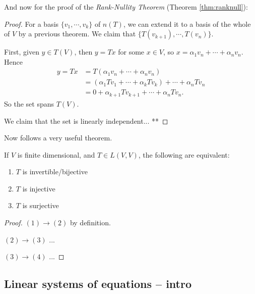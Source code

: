 And now for the proof of the \emph{Rank-Nullity Theorem} (Theorem \ref{thm:ranknull}):
\begin{proof}
  For a basis $\{v_1,\cdots,v_k\}$ of $n(T)$, we can extend it to a basis of the whole of $V$ by a previous theorem. We claim that $\{T(v_{k+1}), \cdots, T(v_{n})\}$.

  First, given $y\in T(V)$, then $y=Tx$ for some $x\in V$, so $x=\alpha_1 v_n + \cdots + \alpha_n v_n$. Hence
  \begin{align*}
    y = Tx &= T(\alpha_1 v_n + \cdots + \alpha_n v_n)\\
      &= (\alpha_1 Tv_1 + \cdots + \alpha_k Tv_k) + \cdots + \alpha_n Tv_n\\
      &= 0 + \alpha_{k+1} Tv_{k+1} + \cdots + \alpha_n Tv_n.
  \end{align*}
  So the set spans $T(V)$.

  We claim that the set is linearly independent... **
\end{proof}


Now follows a very useful theorem.
\begin{theorem}
  If $V$ is finite dimensional, and $T\in L(V,V)$, the following are equivalent:
  \begin{enumerate}[(1)]
    \item $T$ is invertible/bijective
    \item $T$ is injective
    \item $T$ is surjective
  \end{enumerate}
\end{theorem}
\begin{proof}
  $(1)\to(2)$ by definition.

  $(2)\to(3)$ ...

  $(3)\to(4)$ ...
\end{proof}




\subsection{Linear systems of equations -- intro}
